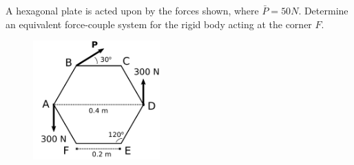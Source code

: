 
\noindent A hexagonal plate is acted upon by the forces shown, where $\bar{P} = 50 N$.  Determine an equivalent force-couple system for the rigid body acting at the corner $F$.


\begin{figure}[ht!]
  \centering
  \includegraphics[height=1.8in]{fig-qz-03.92.png}
\end{figure}

